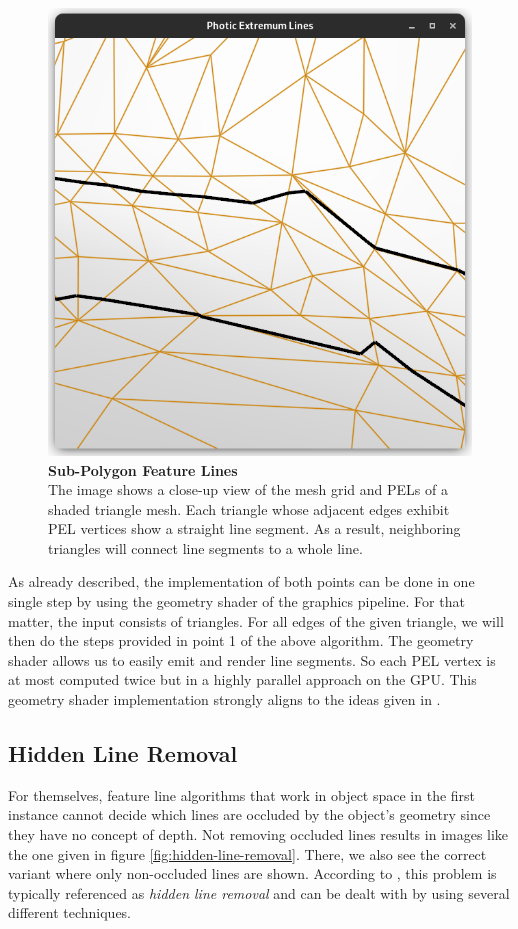 \documentclass[9pt,fleqn,twoside,twocolumn]{stdglobal}
\begin{document}
    \begin{figure}[t]
      \centering
      \includegraphics[width=0.8\linewidth,trim={15px 15 15 50},clip]{images/subpolygon-lines.png}
      \caption{%
        \textbf{Sub-Polygon Feature Lines}\\
        The image shows a close-up view of the mesh grid and PELs of a shaded triangle mesh.
        Each triangle whose adjacent edges exhibit PEL vertices show a straight line segment.
        As a result, neighboring triangles will connect line segments to a whole line.
      }
      \label{fig:subpolygon-feature-lines}
    \end{figure}

    As already described, the implementation of both points can be done in one single step by using the geometry shader of the graphics pipeline.
    For that matter, the input consists of triangles.
    For all edges of the given triangle, we will then do the steps provided in point 1 of the above algorithm.
    The geometry shader allows us to easily emit and render line segments.
    So each PEL vertex is at most computed twice but in a highly parallel approach on the GPU.
    This geometry shader implementation strongly aligns to the ideas given in \textcite{zhang2010}.

  \subsection{Hidden Line Removal}
    For themselves, feature line algorithms that work in object space in the first instance cannot decide which lines are occluded by the object's geometry since they have no concept of depth.
    Not removing occluded lines results in images like the one given in figure \ref{fig:hidden-line-removal}.
    There, we also see the correct variant where only non-occluded lines are shown.
    According to \textcite{isenberg2003}, this problem is typically referenced as \textit{hidden line removal} and can be dealt with by using several different techniques.
\end{document}
